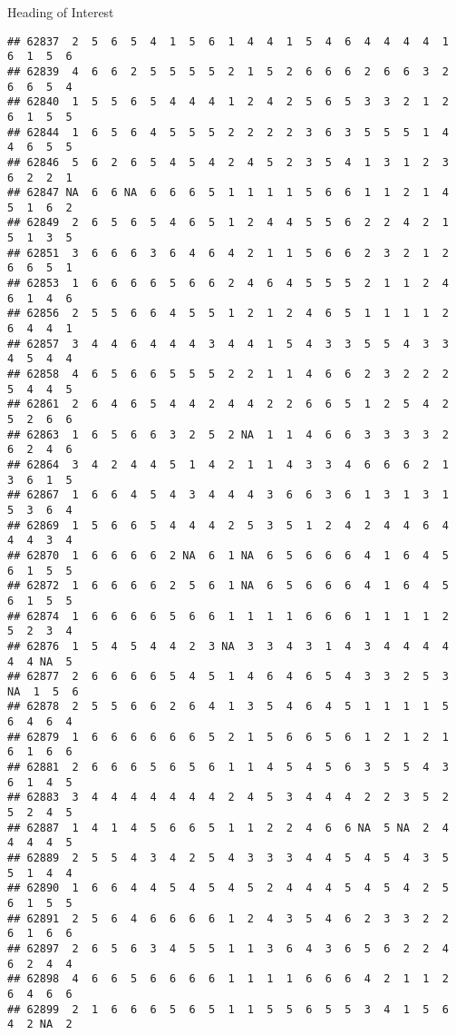 \documentclass[
  ignorenonframetext,
]{beamer}
\begin{document}
\begin{frame}[fragile]{Heading of Interest}
\begin{verbatim}
## 62837  2  5  6  5  4  1  5  6  1  4  4  1  5  4  6  4  4  4  4  1  6  1  5  6
## 62839  4  6  6  2  5  5  5  5  2  1  5  2  6  6  6  2  6  6  3  2  6  6  5  4
## 62840  1  5  5  6  5  4  4  4  1  2  4  2  5  6  5  3  3  2  1  2  6  1  5  5
## 62844  1  6  5  6  4  5  5  5  2  2  2  2  3  6  3  5  5  5  1  4  4  6  5  5
## 62846  5  6  2  6  5  4  5  4  2  4  5  2  3  5  4  1  3  1  2  3  6  2  2  1
## 62847 NA  6  6 NA  6  6  6  5  1  1  1  1  5  6  6  1  1  2  1  4  5  1  6  2
## 62849  2  6  5  6  5  4  6  5  1  2  4  4  5  5  6  2  2  4  2  1  5  1  3  5
## 62851  3  6  6  6  3  6  4  6  4  2  1  1  5  6  6  2  3  2  1  2  6  6  5  1
## 62853  1  6  6  6  6  5  6  6  2  4  6  4  5  5  5  2  1  1  2  4  6  1  4  6
## 62856  2  5  5  6  6  4  5  5  1  2  1  2  4  6  5  1  1  1  1  2  6  4  4  1
## 62857  3  4  4  6  4  4  4  3  4  4  1  5  4  3  3  5  5  4  3  3  4  5  4  4
## 62858  4  6  5  6  6  5  5  5  2  2  1  1  4  6  6  2  3  2  2  2  5  4  4  5
## 62861  2  6  4  6  5  4  4  2  4  4  2  2  6  6  5  1  2  5  4  2  5  2  6  6
## 62863  1  6  5  6  6  3  2  5  2 NA  1  1  4  6  6  3  3  3  3  2  6  2  4  6
## 62864  3  4  2  4  4  5  1  4  2  1  1  4  3  3  4  6  6  6  2  1  3  6  1  5
## 62867  1  6  6  4  5  4  3  4  4  4  3  6  6  3  6  1  3  1  3  1  5  3  6  4
## 62869  1  5  6  6  5  4  4  4  2  5  3  5  1  2  4  2  4  4  6  4  4  4  3  4
## 62870  1  6  6  6  6  2 NA  6  1 NA  6  5  6  6  6  4  1  6  4  5  6  1  5  5
## 62872  1  6  6  6  6  2  5  6  1 NA  6  5  6  6  6  4  1  6  4  5  6  1  5  5
## 62874  1  6  6  6  6  5  6  6  1  1  1  1  6  6  6  1  1  1  1  2  5  2  3  4
## 62876  1  5  4  5  4  4  2  3 NA  3  3  4  3  1  4  3  4  4  4  4  4  4 NA  5
## 62877  2  6  6  6  6  5  4  5  1  4  6  4  6  5  4  3  3  2  5  3 NA  1  5  6
## 62878  2  5  5  6  6  2  6  4  1  3  5  4  6  4  5  1  1  1  1  5  6  4  6  4
## 62879  1  6  6  6  6  6  6  5  2  1  5  6  6  5  6  1  2  1  2  1  6  1  6  6
## 62881  2  6  6  6  5  6  5  6  1  1  4  5  4  5  6  3  5  5  4  3  6  1  4  5
## 62883  3  4  4  4  4  4  4  4  2  4  5  3  4  4  4  2  2  3  5  2  5  2  4  5
## 62887  1  4  1  4  5  6  6  5  1  1  2  2  4  6  6 NA  5 NA  2  4  4  4  4  5
## 62889  2  5  5  4  3  4  2  5  4  3  3  3  4  4  5  4  5  4  3  5  5  1  4  4
## 62890  1  6  6  4  4  5  4  5  4  5  2  4  4  4  5  4  5  4  2  5  6  1  5  5
## 62891  2  5  6  4  6  6  6  6  1  2  4  3  5  4  6  2  3  3  2  2  6  1  6  6
## 62897  2  6  5  6  3  4  5  5  1  1  3  6  4  3  6  5  6  2  2  4  6  2  4  4
## 62898  4  6  6  5  6  6  6  6  1  1  1  1  6  6  6  4  2  1  1  2  6  4  6  6
## 62899  2  1  6  6  6  5  6  5  1  1  5  5  6  5  5  3  4  1  5  6  4  2 NA  2

\end{verbatim}
\end{frame}
\end{document}
